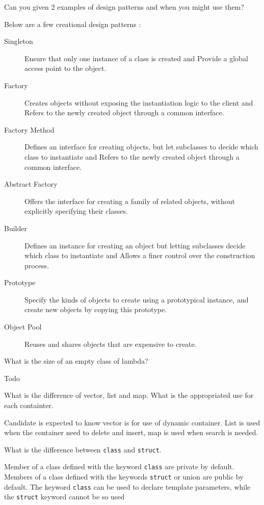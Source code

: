\documentclass{exam}%
\begin{document}
\begin{questions}
\question Can you given 2 examples of design patterns and when you might use them?
\begin{solution}[.2in]
Below are a few creational design patterns :
\begin{description}
	\item[Singleton] Ensure that only one instance of a class is created and Provide a global access point to the object.
	\item[Factory] Creates objects without exposing the instantiation logic to the client and Refers to the newly created object through a common interface.
	\item[Factory Method] Defines an interface for creating objects, but let subclasses to decide which class to instantiate and Refers to the newly created object through a common interface.
	\item[Abstract Factory] Offers the interface for creating a family of related objects, without explicitly specifying their classes.
	\item[Builder] Defines an instance for creating an object but letting subclasses decide which class to instantiate and Allows a finer control over the construction process.
	\item[Prototype] Specify the kinds of objects to create using a prototypical instance, and create new objects by copying this prototype.
	\item[Object Pool] Reuses and shares objects that are expensive to create.
\end{description}
\end{solution}

\question What is the size of an empty class of lambda?
\begin{solution}[.2in]
Todo
\end{solution}

\question What is the difference of vector, list and map. What is the appropriated use for each containter.
\begin{solution}[.2in]
	Candidate is expected to know vector is for use of dynamic container. List is used when the container need to delete and insert, map is used when search is needed.
\end{solution}

\question What is the difference between \lstinline{class} and \lstinline{struct}.
\begin{solution}[.2in]
	Member of a class defined with the keyword \lstinline{class} are private by default. Members of a class defined with the keywords \lstinline{struct} or union are public by default.
	The keyword \lstinline{class} can be used to declare template parameters, while the \lstinline{struct} keyword cannot be so used
\end{solution}


\end{questions}
\end{document}
